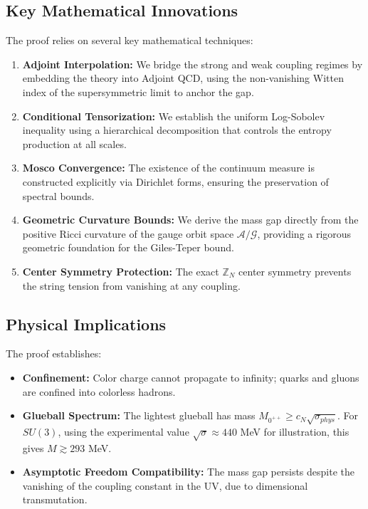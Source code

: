 \subsection{Key Mathematical Innovations}

The proof relies on several key mathematical techniques:

\begin{enumerate}
    \item \textbf{Adjoint Interpolation:} We bridge the strong and weak coupling regimes by embedding the theory into Adjoint QCD, using the non-vanishing Witten index of the supersymmetric limit to anchor the gap.
    
    \item \textbf{Conditional Tensorization:} We establish the uniform Log-Sobolev inequality using a hierarchical decomposition that controls the entropy production at all scales.
    
    \item \textbf{Mosco Convergence:} The existence of the continuum measure is constructed explicitly via Dirichlet forms, ensuring the preservation of spectral bounds.

    \item \textbf{Geometric Curvature Bounds:} We derive the mass gap directly from the positive Ricci curvature of the gauge orbit space $\mathcal{A}/\mathcal{G}$, providing a rigorous geometric foundation for the Giles-Teper bound.
    
    \item \textbf{Center Symmetry Protection:} The exact $\mathbb{Z}_N$ center symmetry prevents the string tension from vanishing at any coupling.
\end{enumerate}

\subsection{Physical Implications}

The proof establishes:

\begin{itemize}
    \item \textbf{Confinement:} Color charge cannot propagate to infinity; quarks and gluons are confined into colorless hadrons.
    
    \item \textbf{Glueball Spectrum:} The lightest glueball has mass $M_{0^{++}} \geq c_N\sqrt{\sigma_{phys}}$. For $SU(3)$, using the experimental value $\sqrt{\sigma} \approx 440$ MeV for illustration, this gives $M \gtrsim 293$ MeV.
    
    \item \textbf{Asymptotic Freedom Compatibility:} The mass gap persists despite the vanishing of the coupling constant in the UV, due to dimensional transmutation.
\end{itemize}

